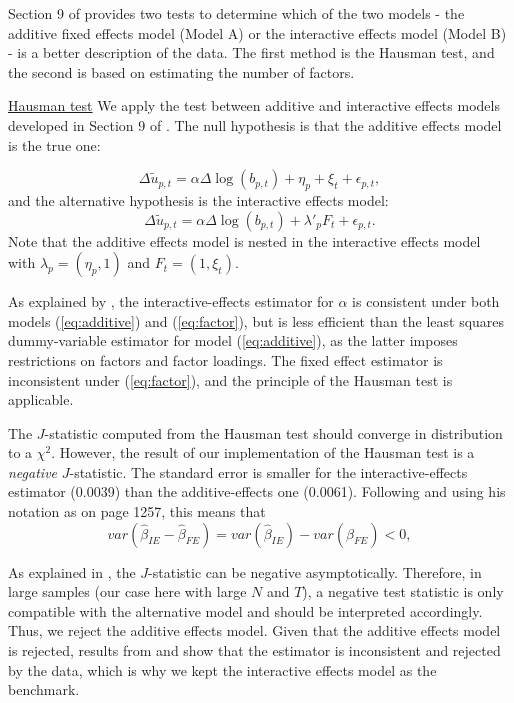 \documentclass[12pt]{article}
\newcommand{\1}{\mathbf{1}}
\begin{document}
\begin{appendix}
Section 9 of \citet{bai:09} provides two tests to determine which of the two models - the additive fixed effects model (Model A) or the interactive effects model (Model B) - is a better description of the data. The first method is the Hausman test, and the second is based on estimating the number of factors.

\underline{Hausman test}
We apply the test between additive and interactive effects models developed in Section 9 of \citet{bai:09}.  The null hypothesis is that the additive effects model is the true one:

\begin{equation}
    \Delta\tilde{u}_{p,t}=\alpha \Delta\log(b_{p,t})+\eta_p+\xi_t+\epsilon_{p,t},
    \label{eq:additive}
\end{equation}
and the alternative hypothesis is the interactive effects model:
\begin{equation}
    \Delta\tilde{u}_{p,t}=\alpha \Delta\log(b_{p,t})+\lambda'_p F_t+\epsilon_{p,t}.
    \label{eq:factor}
\end{equation}
Note that the additive effects model is nested in the interactive effects model with $\lambda_p=(\eta_p,1)$ and $F_t=(1,\xi_t)$.

As explained by \citet{bai:09}, the interactive-effects estimator for $\alpha$ is consistent under both models (\ref{eq:additive}) and (\ref{eq:factor}), but is less efficient than the least squares dummy-variable estimator for model (\ref{eq:additive}), as the latter imposes restrictions on factors and factor loadings. The fixed effect estimator is inconsistent under (\ref{eq:factor}), and the principle of the Hausman test is applicable.

The $J$-statistic computed from the Hausman test should converge in distribution to a $\chi^2$. However, the result of our implementation of the Hausman test is a \emph{negative} $J$-statistic. The standard error is smaller for the interactive-effects estimator (0.0039) than the additive-effects one (0.0061). Following \citet{bai:09} and using his notation as on page 1257, this means that
$$
var(\hat{\beta}_{IE}-\hat{\beta}_{FE}) = var(\hat{\beta}_{IE}) - var(\hat{\beta}_{FE}) < 0,
$$

As explained in \citet{schreiber:08}, the $J$-statistic can be negative asymptotically. Therefore, in large samples (our case here with large $N$ and $T$), a negative test statistic is only compatible with the alternative model and should be interpreted accordingly. Thus, we reject the additive effects model. Given that the additive effects model is rejected, results from \citet{bai:09} and \citet{gobillon+magnac:13} show that the estimator is inconsistent and rejected by the data, which is why we kept the interactive effects model as the benchmark.



\end{appendix}
\end{document}
